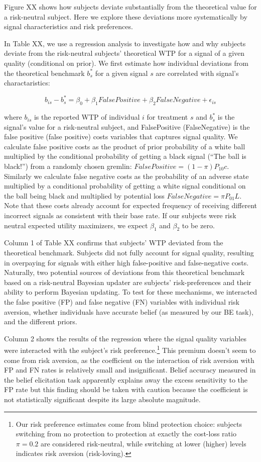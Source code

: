 \documentclass[12pt,a4paper]{article}
\begin{document}
Figure XX shows how subjects deviate substantially from the theoretical value for a risk-neutral subject. Here we explore these deviations more systematically by signal characteristics and risk preferences. 

In Table XX, we use a regression analysis to investigate how and why subjects deviate from the risk-neutral subjects’ theoretical WTP for a signal of a given quality (conditional on prior). We first estimate how individual deviations from the theoretical benchmark $b^*_s$ for a given signal $s$ are correlated with signal's charactaristics:

$$b_{is} - b^*_s = \beta_0 + \beta_1 FalsePositive + \beta_2 FalseNegative + \epsilon_{is}$$

where $b_{is}$ is the reported WTP of individual $i$ for treatment $s$ and $b^*_s$ is the signal's value for a risk-neutral subject, and FalsePositive (FalseNegative) is the false positive (false positive) costs variables that captures signal quality. We calculate false positive costs as the product of prior probability of a white ball multiplied by the conditional probability of getting a black signal (“The ball is black!”) from a randomly chosen gremlin: $FalsePositive=(1-\pi) P_{10}c$. Similarly we calculate false negative costs as the probability of an adverse state multiplied by a conditional probability of getting a white signal conditional on the ball being black and multiplied by potential loss $FalseNegative=\pi P_{01}L$. Note that these costs already account for expected frequency of receiving different incorrect signals as consistent with their base rate. If our subjects were risk neutral expected utility maximizers, we expect $\beta_1$ and $\beta_2$ to be zero.

Column 1 of Table XX confirms that subjects’ WTP deviated from the theoretical benchmark. Subjects did not fully account for signal quality, resulting in overpaying for signals with either high false-positive and false-negative costs. Naturally, two potential sources of deviations from this theoretical benchmark based on a risk-neutral Bayesian updater are subjects’ risk-preferences and their ability to perform Bayesian updating. To test for these mechanisms, we interacted the false positive (FP) and false negative (FN) variables with individual risk aversion, whether individuals have accurate belief (as measured by our BE task), and the different priors.

Column 2 shows the results of the regression where the signal quality variables were interacted with the subject’s risk preference.\footnote{Our risk preference estimates come from blind protection choice: subjects switching from no protection to protection at exactly the cost-loss ratio $\pi=0.2$ are considered risk-neutral, while switching at lower (higher) levels indicates risk aversion (risk-loving).} This premium doesn’t seem to come from risk aversion, as the coefficient on the interaction of risk aversion with FP and FN rates is relatively small and insignificant. Belief accuracy measured in the belief elicitation task apparently explains away the excess sensitivity to the FP rate but this finding should be taken with caution because the coefficient is not statistically significant despite its large absolute magnitude.
\end{document}
